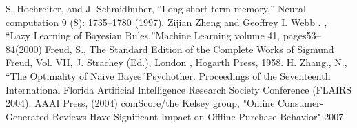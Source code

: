 \documentclass{mcmthesis}
\begin{document}
\begin{thebibliography}{99}
   S. Hochreiter, and J. Schmidhuber, “Long short-term memory,” Neural computation 9 (8): 1735--1780 (1997).
   Zijian Zheng and Geoffrey I. Webb . , “Lazy Learning of Bayesian Rules,”Machine Learning volume 41, pages53–84(2000)
   Freud, S., The Standard Edition of the Complete Works of Sigmund Freud, Vol. VII, J. Strachey (Ed.), London , Hogarth Press, 1958. 
   H. Zhang., N., “The Optimality of Naive Bayes”Psychother. Proceedings of the Seventeenth International Florida Artificial Intelligence Research Society Conference (FLAIRS 2004), AAAI Press, (2004)
   comScore/the Kelsey group, "Online Consumer-Generated Reviews Have Significant Impact on Offline Purchase Behavior" 2007.


  \end{thebibliography}
\end{document}

